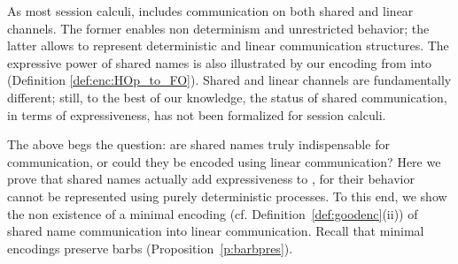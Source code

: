 \noi As most session calculi, 
\HOp includes communication on both shared and linear channels.
The former enables non determinism and unrestricted behavior; the latter allows to represent
deterministic and linear communication structures.
The expressive power of shared names is also illustrated by our 
encoding from \HOp into \sessp (Definition \ref{def:enc:HOp_to_FO}).
Shared and linear channels are fundamentally different; still, to the best of our knowledge,
the status of shared communication, in terms of expressiveness, has not been formalized for session calculi.

The above begs the question: are shared names truly indispensable for communication, or could they
be encoded using linear communication?
Here we prove that shared names actually add expressiveness to \HOp,
for their behavior cannot be represented using purely deterministic processes.
To this end, we show the non existence of a minimal encoding 
(cf. Definition~\ref{def:goodenc}(ii))
of shared name communication into linear 
communication. Recall that minimal encodings preserve barbs (Proposition~\ref{p:barbpres}).



